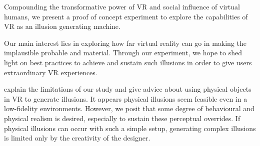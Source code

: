 Compounding the transformative power of VR and social influence of virtual humans, we present a proof of concept experiment to explore the capabilities of VR as an illusion generating machine.

Our main interest lies in exploring how far virtual reality can go in making the implausible probable and material.  Through our experiment, we hope to shed light on best practices to achieve and sustain such illusions in order to give users extraordinary VR experiences. 

 explain the limitations of our study and give advice about using physical objects in VR to generate illusions. It appears physical illusions seem feasible even in a low-fidelity environments. However, we posit that some degree of behavioural and physical realism is desired, especially to sustain these perceptual overrides. If physical illusions can occur with such a simple setup, generating complex illusions is limited only by the creativity of the designer.